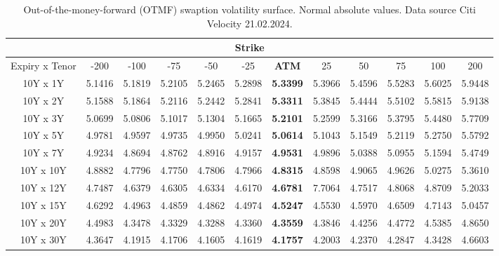 \begin{table}[H]
    \centering
    \begin{tabular}{|c|c|c|c|c|c|c|c|c|c|c|c|}
        \hline  
            \multicolumn{12}{|c|}{Strike} \\ 
        \hline
        Expiry x Tenor& -200   & -100   & -75    & -50    & -25    & \textbf{ATM}    & 25     & 50     & 75     & 100    & 200    \\ 
        \hline
        \rowcolor{lightgray!40} 10Y x 1Y  & 5.1416 & 5.1819 & 5.2105 & 5.2465 & 5.2898 & \textbf{5.3399} & 5.3966 & 5.4596 & 5.5283 & 5.6025 & 5.9448 \\
        10Y x 2Y  & 5.1588 & 5.1864 & 5.2116 & 5.2442 & 5.2841 & \textbf{5.3311} & 5.3845 & 5.4444 & 5.5102 & 5.5815 & 5.9138 \\
        \rowcolor{lightgray!40} 10Y x 3Y  & 5.0699 & 5.0806 & 5.1017 & 5.1304 & 5.1665 & \textbf{5.2101} & 5.2599 & 5.3166 & 5.3795 & 5.4480 & 5.7709 \\
        10Y x 5Y  & 4.9781 & 4.9597 & 4.9735 & 4.9950 & 5.0241 & \textbf{5.0614} & 5.1043 & 5.1549 & 5.2119 & 5.2750 & 5.5792 \\
        \rowcolor{lightgray!40} 10Y x 7Y  & 4.9234 & 4.8694 & 4.8762 & 4.8916 & 4.9157 & \textbf{4.9531} & 4.9896 & 5.0388 & 5.0955 & 5.1594 & 5.4749 \\
        10Y x 10Y & 4.8882 & 4.7796 & 4.7750 & 4.7806 & 4.7966 & \textbf{4.8315} & 4.8598 & 4.9065 & 4.9626 & 5.0275 & 5.3610 \\
        \rowcolor{lightgray!40} 10Y x 12Y & 4.7487 & 4.6379 & 4.6305 & 4.6334 & 4.6170 & \textbf{4.6781} & 7.7064 & 4.7517 & 4.8068 & 4.8709 & 5.2033 \\
        10Y x 15Y & 4.6292 & 4.4963 & 4.4859 & 4.4862 & 4.4974 & \textbf{4.5247} & 4.5530 & 4.5970 & 4.6509 & 4.7143 & 5.0457 \\
        \rowcolor{lightgray!40}10Y x 20Y & 4.4983 & 4.3478 & 4.3329 & 4.3288 & 4.3360 & \textbf{4.3559} & 4.3846 & 4.4256 & 4.4772 & 4.5385 & 4.8650 \\
        10Y x 30Y & 4.3647 & 4.1915 & 4.1706 & 4.1605 & 4.1619 & \textbf{4.1757} & 4.2003 & 4.2370 & 4.2847 & 4.3428 & 4.6603 \\ 
        \hline
 \end{tabular}
    \caption{Out-of-the-money-forward (OTMF) swaption volatility surface. Normal absolute values.  Data source Citi Velocity  21.02.2024. }
    \label{tab:swaption_skew_OTMF}
\end{table}

